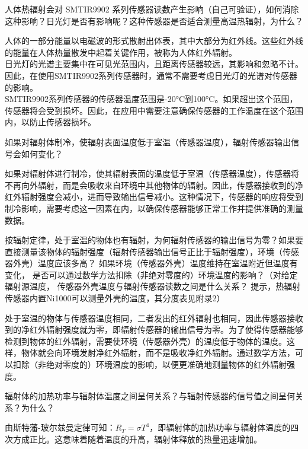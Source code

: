 \documentclass[dvipsnames, svgnames,a4paper,11pt]{article}
\begin{document}
	\begin{question}
		人体热辐射会对 SMTIR9902 系列传感器读数产生影响（自己可验证），如何消除这种影响？日光灯是否有影响呢？这种传感器是否适合测量高温热辐射，为什么？
	\end{question}
	人体的一部分能量以电磁波的形式散射出体表，其中大部分为红外线。这些红外线的能量在人体热量散发中起着关键作用，被称为人体红外辐射。\\
日光灯的光谱主要集中在可见光范围内，且距离传感器较远，其影响和忽略不计。因此，在使用SMTIR9902系列传感器时，通常不需要考虑日光灯的光谱对传感器的影响。\\
 SMTIR9902系列传感器的传感器温度范围是-20°C到100°C。如果超出这个范围，传感器将会受到损坏。因此，在应用中需要注意确保传感器的工作温度在这个范围内，以防止传感器损坏。\\
	\begin{question}
		如果对辐射体制冷，使辐射表面温度低于室温（传感器温度），辐射传感器输出信号会如何变化？
	\end{question}
	如果对辐射体进行制冷，使其辐射表面的温度低于室温（传感器温度），传感器将不再向外辐射，而是会吸收来自环境中其他物体的辐射。因此，传感器接收到的净红外辐射强度会减小，进而导致输出信号减小。这种情况下，传感器的响应将受到制冷影响，需要考虑这一因素在内，以确保传感器能够正常工作并提供准确的测量数据。
	\begin{question}
		按辐射定律，处于室温的物体也有辐射，为何辐射传感器的输出信号为零？如果要直接测量该物体的辐射强度（辐射传感器输出信号正比于辐射强度），环境（传感器外壳）温度应该多高？ 如果环境（传感器外壳）温度维持在室温附近但温度有变化， 是否可以通过数学方法扣除（非绝对零度的）环境温度的影响？（对给定辐射源温度， 传感器外壳温度与辐射传感器读数之间是什么关系？ 提示，热辐射传感器内置Ni1000可以测量外壳的温度，其分度表见附录2）
	\end{question}

	处于室温的物体与传感器温度相同，二者发出的红外辐射也相同，因此传感器接收到的净红外辐射强度就为零，即辐射传感器的输出信号为零。为了使得传感器能够检测到物体的红外辐射，需要使环境（传感器外壳）的温度低于物体的温度。这样，物体就会向环境发射净红外辐射，而不是吸收净红外辐射。通过数学方法，可以扣除（非绝对零度的）环境温度的影响，以便更准确地测量物体的红外辐射强度。
	\begin{question}
		辐射体的加热功率与辐射体温度之间呈何关系？与辐射传感器的信号值之间呈何关系？为什么？
	\end{question}
	由斯特藩-玻尔兹曼定律可知：$R_T = \sigma T^4$，即辐射体的加热功率与辐射体温度的四次方成正比。这意味着随着温度的升高，辐射体释放的热量迅速增加。\\
\end{document}

